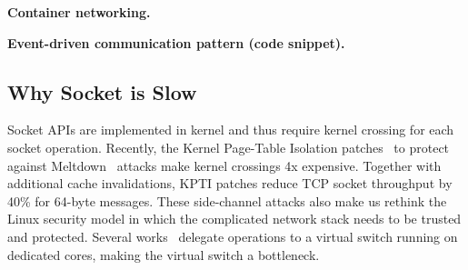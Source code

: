 \textbf{Container networking.}

\textbf{Event-driven communication pattern (code snippet).}








\subsection{Why Socket is Slow}
\label{subsec:challenges}


Socket APIs are implemented in kernel and thus require kernel crossing for each socket operation. Recently, the Kernel Page-Table Isolation patches~\cite{kpti} to protect against Meltdown~\cite{Lipp2018meltdown} attacks make kernel crossings 4x expensive.
Together with additional cache invalidations, KPTI patches reduce TCP socket throughput by 40\% for 64-byte messages. These side-channel attacks also make us rethink the Linux security model in which the complicated network stack needs to be trusted and protected. %
Several works~\cite{martins2014clickos,roghanchi2017ffwd,huang2017high} delegate operations to a virtual switch running on dedicated cores, making the virtual switch a bottleneck.

